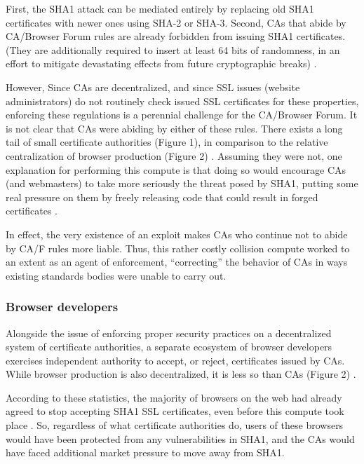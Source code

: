 \documentclass[sigconf]{acmart}
\begin{document}
First, the SHA1 attack can be mediated entirely by
replacing old SHA1 certificates with newer ones using SHA-2 or SHA-3.
Second, CAs that abide by CA/Browser Forum rules are already forbidden from issuing SHA1 certificates. (They are additionally required to insert at least 64 bits of randomness, in an effort to mitigate devastating effects from future cryptographic breaks) \cite{Stevens2017}.

However, Since CAs are decentralized, and since SSL issues (website administrators) do not routinely check issued SSL certificates for these properties, enforcing these regulations is a perennial challenge for the CA/Browser Forum. It is not clear that CAs were abiding by either of these rules.
There exists a long tail of small certificate authorities (Figure 1), in comparison to the relative centralization of browser production (Figure 2) \cite{Q-Success2017}.
Assuming they were not, one explanation for performing this compute is that doing so would encourage CAs (and webmasters) to take more seriously the threat posed by SHA1,
putting some real pressure on them by freely releasing code that could result in forged certificates \cite{Stevens2017github}.

In effect, the very existence of an exploit makes CAs who continue not to abide by CA/F rules more liable.
Thus, this rather costly collision compute worked to an extent as an agent of enforcement,
``correcting'' the behavior of CAs in ways existing standards bodies were unable to carry out.

\subsubsection{Browser developers}
\label{sec:orga3e61a4}

Alongside the issue of enforcing proper security practices on a decentralized system of certificate authorities, 
a separate ecosystem of browser developers exercises independent authority to accept, or reject, certificates issued by CAs.
While browser production is also decentralized, it is less so than CAs (Figure 2)
\cite{Buckler2016}.

According to these statistics, the majority of browsers on the web had already agreed to stop accepting SHA1 SSL certificates,
even before this compute took place
\cite{Sleevi2014,Mozilla2017}.
So, regardless of what certificate authorities do, users of these browsers would have been protected from any vulnerabilities in SHA1, 
and the CAs would have faced additional market pressure to move away from SHA1.
\end{document}
